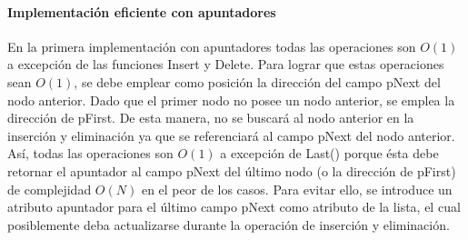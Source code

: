 \paragraph{Implementación eficiente con apuntadores}

En la primera implementación con apuntadores todas las operaciones son $O(1)$ a excepción de las funciones Insert y Delete. Para lograr que estas operaciones sean $O(1)$, se debe emplear como posición la dirección del campo pNext del nodo anterior. Dado que el primer nodo no posee un nodo anterior, se emplea la dirección de pFirst. De esta manera, no se buscará al nodo anterior en la inserción y eliminación ya que se referenciará al campo pNext del nodo anterior. Así, todas las operaciones son $O(1)$ a excepción de Last() porque ésta debe retornar el apuntador al campo pNext del último nodo (o la dirección de pFirst) de complejidad $O(N)$ en el peor de los casos. Para evitar ello, se introduce un atributo apuntador para el último campo pNext como atributo de la lista, el cual posiblemente deba actualizarse durante la operación de inserción y eliminación.
